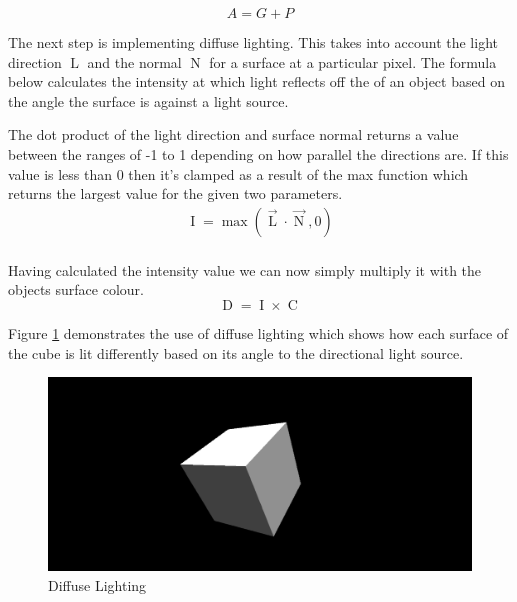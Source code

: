 \documentclass[11pt]{article}
\begin{document}
\newcommand{\intensity}{\operatorname{I}}
\newcommand{\lightdir}{\operatorname{L}}
\newcommand{\normal}{\operatorname{N}}
\newcommand{\diffuse}{\operatorname{D}}
\newcommand{\glslcolor}{\operatorname{C}}
\newcommand{\glslmax}{\operatorname{max}}

\begin{equation}
	A = G + P
\end{equation}

The next step is implementing diffuse lighting. This takes into account
the light direction $\lightdir$ and the normal $\normal$ for a surface at a particular
pixel. The formula below calculates the intensity at which light reflects off the
of an object based on the angle the surface is against a light source. 

The dot product of the light direction and surface normal returns a value between
the ranges of -1 to 1 depending on how parallel the directions are. If this value
is less than 0 then it's clamped as a result of the max function which returns the largest value for the given two parameters.
\begin{gather}
	\intensity = \glslmax(\vec{\lightdir} \cdot \vec{\normal}, 0) \\
\end{gather}

Having calculated the intensity value we can now simply multiply it with the objects
surface colour.
\begin{equation}
	\diffuse = \intensity \times \glslcolor
\end{equation}

Figure \ref{fig:diffuse} demonstrates the use of diffuse lighting which shows how each
surface of the cube is lit differently based on its angle to the directional light 
source. 
\begin{figure}[h!]
  \centering
  \includegraphics[width=\textwidth]{images/diffuse_lighting.png}
  \caption{Diffuse Lighting}
  \label{fig:diffuse}
\end{figure}
\end{document}
